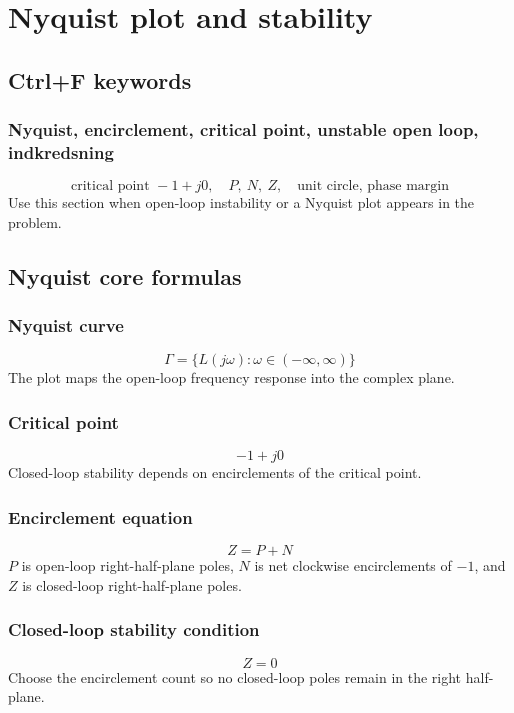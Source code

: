 \section{Nyquist plot and stability}

\subsection{Ctrl+F keywords}

\subsubsection{Nyquist, encirclement, critical point, unstable open loop, indkredsning}
\[
\text{critical point }-1+j0,\quad P,\ N,\ Z,\quad \text{unit circle, phase margin}
\]
Use this section when open-loop instability or a Nyquist plot appears in the problem.

\subsection{Nyquist core formulas}

\subsubsection{Nyquist curve}
\[
\Gamma=\{L(j\omega):\omega\in(-\infty,\infty)\}
\]
The plot maps the open-loop frequency response into the complex plane.

\subsubsection{Critical point}
\[
-1+j0
\]
Closed-loop stability depends on encirclements of the critical point.

\subsubsection{Encirclement equation}
\[
Z=P+N
\]
\(P\) is open-loop right-half-plane poles, \(N\) is net clockwise encirclements of \(-1\), and \(Z\) is closed-loop right-half-plane poles. %

\subsubsection{Closed-loop stability condition}
\[
Z=0
\]
Choose the encirclement count so no closed-loop poles remain in the right half-plane.

